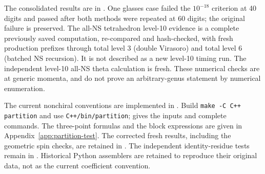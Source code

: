 The consolidated results are in
.
One glasses case failed the $10^{-18}$ criterion at 40 digits and
passed after both methods were repeated at 60 digits; the original
failure is preserved. The all-NS tetrahedron level-10 evidence is a
complete previously saved computation, re-compared and hash-checked,
with fresh production prefixes through total level 3 (double Virasoro)
and total level 6 (batched NS recursion). It is not described as a new
level-10 timing run. The independent level-10 all-NS theta calculation
is fresh. These numerical checks are at generic momenta, and do not
prove an arbitrary-genus statement by numerical enumeration.

The current nonchiral conventions are implemented in
. Build
\texttt{make -C C++ partition} and use \texttt{C++/bin/partition};
 gives the inputs and complete commands.
The three-point formulas and the block expressions are given in
Appendix~\ref{app:partition-test}. The corrected fresh results,
including the geometric spin checks, are retained in
.
The independent identity-residue tests remain in
.
Historical Python assemblers are retained to reproduce their
original data, not as the current coefficient convention.
